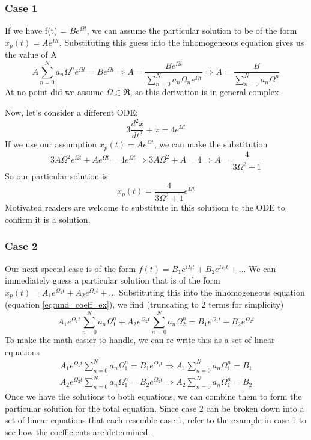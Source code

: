 \documentclass{article}
\newcommand{\be}{\begin{equation}}
\newcommand{\ee}{\end{equation}}
\begin{document}
\subsubsection*{Case 1}
If we have f(t) = $Be^{\Omega t}$, we can assume the particular solution to be of the form $x_p(t) = Ae^{\Omega t}$.
Substituting this guess into the inhomogeneous equation gives us the value of A
\be
A \sum_{n=0}^N a_n \Omega^n e^{\Omega t} = B e^{\Omega t} \Rightarrow A = \dfrac{B e^{\Omega t}}{\sum\limits_{n=0}^N a_n \Omega_n e^{\Omega t}} \Rightarrow A = \dfrac{B}{\sum\limits_{n=0}^N a_n \Omega^n}
\ee
At no point did we assume $\Omega \in \Re$, so this derivation is in general complex. \bigskip

Now, let's consider a different ODE:
\be
3 \frac{d^2 x}{dt^2} + x = 4e^{\Omega t}
\ee
If we use our assumption $x_p(t) = Ae^{\Omega t}$, we can make the substitution
\be
3A\Omega^2e^{\Omega t} + Ae^{\Omega t} = 4e^{\Omega t} \Rightarrow 3A\Omega^2 + A = 4 \Rightarrow A = \frac{4}{3\Omega^2 + 1}
\ee
So our particular solution is
\be
x_p(t) = \frac{4}{3\Omega^2 + 1} e^{\Omega t}
\ee
Motivated readers are welcome to substitute in this solutiom to the ODE to confirm it is a solution.

\subsubsection*{Case 2}
Our next special case is of the form $f(t) = B_1e^{\Omega_1t} + B_2e^{\Omega_2t} + \hdots$
We can immediately guess a particular solution that is of the form $x_p(t) = A_1 e^{\Omega_1t} + A_2 e^{\Omega_2t} + \hdots$
Substituting this into the inhomogeneous equation (equation \ref{eq:und_coeff_ex}), we find (truncating to 2 terms for simplicity)
\be
A_1 e^{\Omega_1t} \sum_{n=0}^N a_n \Omega_1^n + A_2 e^{\Omega_2t} \sum_{n=0}^N a_n \Omega_2^n = B_1e^{\Omega_1 t} + B_2 e^{\Omega_2 t}
\ee
To make the math easier to handle, we can re-write this as a set of linear equations
\be
\begin{split}
   A_1 e^{\Omega_1 t} \sum_{n=0}^N a_n\Omega_1^n = B_1 e^{\Omega_1 t} \Rightarrow A_1 \sum_{n=0}^N a_n\Omega_1^n = B_1 \\
   A_2 e^{\Omega_2 t} \sum_{n=0}^N a_n\Omega_1^n = B_2 e^{\Omega_2 t} \Rightarrow A_2 \sum_{n=0}^N a_n\Omega_1^n = B_2
\end{split}
\ee
Once we have the solutions to both equations, we can combine them to form the particular solution for the total equation.
Since case 2 can be broken down into a set of linear equations that each resemble case 1, refer to the example in case 1 to see how the coefficients are determined.
\end{document}
